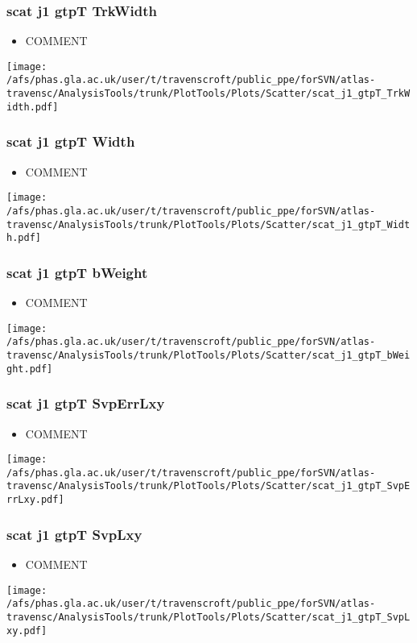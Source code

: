 \documentclass{beamer}
\begin{document}
\begin{frame}
\frametitle{scat j1 gtpT TrkWidth}
\begin{itemize}
\item COMMENT
\end{itemize}
\begin{center}
\texttt{[image: /afs/phas.gla.ac.uk/user/t/travenscroft/public\_ppe/forSVN/atlas-travensc/AnalysisTools/trunk/PlotTools/Plots/Scatter/scat\_j1\_gtpT\_TrkWidth.pdf]}
\end{center}
\end{frame}

\begin{frame}
\frametitle{scat j1 gtpT Width}
\begin{itemize}
\item COMMENT
\end{itemize}
\begin{center}
\texttt{[image: /afs/phas.gla.ac.uk/user/t/travenscroft/public\_ppe/forSVN/atlas-travensc/AnalysisTools/trunk/PlotTools/Plots/Scatter/scat\_j1\_gtpT\_Width.pdf]}
\end{center}
\end{frame}

\begin{frame}
\frametitle{scat j1 gtpT bWeight}
\begin{itemize}
\item COMMENT
\end{itemize}
\begin{center}
\texttt{[image: /afs/phas.gla.ac.uk/user/t/travenscroft/public\_ppe/forSVN/atlas-travensc/AnalysisTools/trunk/PlotTools/Plots/Scatter/scat\_j1\_gtpT\_bWeight.pdf]}
\end{center}
\end{frame}

\begin{frame}
\frametitle{scat j1 gtpT SvpErrLxy}
\begin{itemize}
\item COMMENT
\end{itemize}
\begin{center}
\texttt{[image: /afs/phas.gla.ac.uk/user/t/travenscroft/public\_ppe/forSVN/atlas-travensc/AnalysisTools/trunk/PlotTools/Plots/Scatter/scat\_j1\_gtpT\_SvpErrLxy.pdf]}
\end{center}
\end{frame}

\begin{frame}
\frametitle{scat j1 gtpT SvpLxy}
\begin{itemize}
\item COMMENT
\end{itemize}
\begin{center}
\texttt{[image: /afs/phas.gla.ac.uk/user/t/travenscroft/public\_ppe/forSVN/atlas-travensc/AnalysisTools/trunk/PlotTools/Plots/Scatter/scat\_j1\_gtpT\_SvpLxy.pdf]}
\end{center}
\end{frame}
\end{document}
